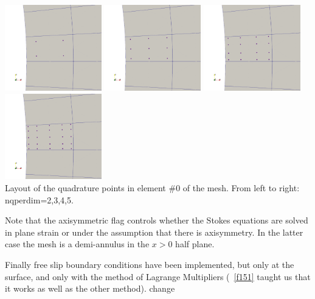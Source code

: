 \begin{center}
\includegraphics[width=4.2cm]{python_codes/fieldstone_152/images/nq4}
\includegraphics[width=4.2cm]{python_codes/fieldstone_152/images/nq9}
\includegraphics[width=4.2cm]{python_codes/fieldstone_152/images/nq16}
\includegraphics[width=4.2cm]{python_codes/fieldstone_152/images/nq25}\\
{\captionfont Layout of the quadrature points in element \#0 of the mesh. 
From left to right: {\python nqperdim=2,3,4,5}.} 
\end{center}

Note that the {\python axisymmetric} flag controls whether the Stokes equations 
are solved in plane strain or under the assumption that there is axisymmetry. 
In the latter case the mesh is a demi-annulus in the $x>0$ half plane.


\newpage

Finally free slip boundary conditions have been implemented, but only at the 
surface, and only with the method of Lagrange Multipliers (\stone~\ref{f151}
taught us that it works as well as the other method).  
{\color{red} change}

